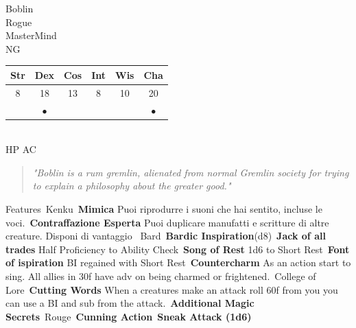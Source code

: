 \documentclass[11pt]{article}
\newcommand*\circled[1]{\tikz[baseline=(char.base)]{
\node[shape=circle,draw,inner sep=2pt] (char) {#1};}}
\begin{document}
\begin{minipage}{0.5\textwidth}%
\Huge{\Fontauri Boblin } \\
\Large{Rogue} \\
\textcolor{OCRA}{MasterMind} \\
NG
\vspace{1cm}
\begin{tabular}{cccccc}
Str & Dex & Cos & Int & Wis & Cha \\ \hline 
8 & 18 & 13 & 8 & 10 & 20\\ 
 & $\bullet$ & & & & $\bullet$
\end{tabular}
\vspace{1cm} \\
\textcolor{OCRA}{HP} \circled{58} \hspace{3cm} \textcolor{OCRA}{AC} \circled{15}
\end{minipage}
\vspace{0.5cm}
\begin{quote}
\textit{\Fontauri "Boblin is a rum gremlin, alienated from normal Gremlin society for trying to explain a philosophy about the greater good."}
\end{quote}
\begin{minipage}[t]{.5\textwidth}
{\huge \Fontauri Features}\
\textcolor{OCRA}{Kenku}\
\textbf{Mimica} Puoi riprodurre i suoni che hai sentito, incluse le voci.\
\textbf{Contraffazione Esperta} Puoi duplicare manufatti e scritture di altre creature. Disponi di vantaggio \
\textcolor{OCRA}{Bard}\
\textbf{Bardic Inspiration}(d8)\
\textbf{Jack of all trades} Half Proficiency to Ability Check\
\textbf{Song of Rest} 1d6 to Short Rest\
\textbf{Font of ispiration} BI regained with Short Rest\
\textbf{Countercharm} As an action start to sing. All allies in 30f have adv on being charmed or frightened.\
\textcolor{OCRA}{College of Lore}\
\textbf{Cutting Words} When a creatures make an attack roll 60f from you you can use a BI and sub from the attack.\
\textbf{Additional Magic Secrets}\
\textcolor{OCRA}{Rouge}\
\textbf{Cunning Action}\
\textbf{Sneak Attack (1d6)}\
\end{minipage}
\end{document}
